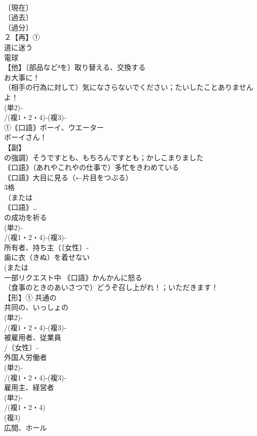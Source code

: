 \documentclass[8pt]{extreport}
\begin{document}
\begin{CJK}{UTF8}{min}
\\	〔現在〕
\\	〔過去〕
\\	〔過分〕
\\	２【再】①
\\	道に迷う 
\\	電球 
\\	【他】〔部品など⁴を〕取り替える、交換する 
\\	お大事に！
\\	（相手の行為に対して）気になさらないでください；たいしたことありませんよ！
\\	(単2)‐
\\	/(複1・2・4)‐(複3)‐
\\	①｟口語｠ボーイ、ウエーター 
\\	ボーイさん！
\\	【副】
\\	の強調）そうですとも、もちろんですとも；かしこまりました
\\	｟口語｠（あれやこれやの仕事で）多忙をきわめている
\\	｟口語｠大目に見る（←片目をつぶる）
\\	3格 
\\	（または
\\	｟口語｠…
\\	の成功を祈る
\\	(単2)‐
\\	/(複1・2・4)‐(複3)‐
\\	所有者、持ち主（〔女性〕-
\\	歯に衣（きぬ）を着せない
\\	(または
\\	一部リクエスト中	｟口語｠かんかんに怒る
\\	（食事のときのあいさつで）どうぞ召し上がれ！；いただきます！
\\	【形】① 共通の 
\\	共同の、いっしょの
\\	(単2)‐
\\	/(複1・2・4)‐(複3)‐
\\	被雇用者、従業員 
\\	/〔女性〕-
\\	外国人労働者
\\	(単2)‐
\\	/(複1・2・4)‐(複3)‐
\\	雇用主、経営者 
\\	(単2)‐
\\	/(複1・2・4)
\\	(複3)
\\	広間、ホール 

\end{CJK}
\end{document}
